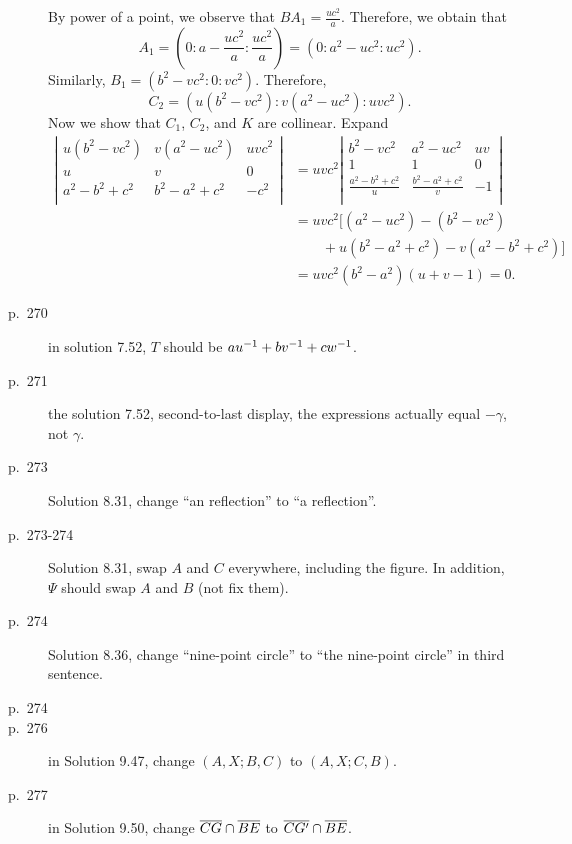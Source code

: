 \documentclass[11pt]{scrartcl}
\begin{document}
\begin{description}
  By power of a point, we observe that $BA_1 = \frac{uc^2}{a}$.
  Therefore, we obtain that
  \[ A_1 = \left( 0:a-\frac{uc^2}{a}: \frac{uc^2}{a} \right)
    = \left( 0:a^{2}-uc^2 : uc^2 \right). \]
  Similarly, $B_1 = \left( b^2-vc^2 : 0 : vc^2 \right)$.
  Therefore,
  \[ C_2 = \left( u(b^2-vc^2) : v(a^2-uc^2) : uvc^2 \right). \]
  Now we show that $C_1$, $C_2$, and $K$ are collinear.
  Expand
  \begin{align*}
  \left\lvert
  \begin{array}{ccc}
    u (b^2-vc^2) & v (a^2-uc^2) & uv c^2 \\
    u & v & 0 \\
    a^2-b^2+c^2 & b^2-a^2+c^2 & -c^2 \\
  \end{array}
  \right\rvert
  &= uvc^2 \left\lvert
  \begin{array}{ccc}
    b^2-vc^2 & a^2-uc^2 & uv \\
    1 & 1 & 0 \\
    \frac{a^2-b^2+c^2}{u} & \frac{b^2-a^2+c^2}{v} & -1 \\
  \end{array}
  \right\rvert \\
  &= uvc^2 \Big[ (a^2-uc^2)-(b^2-vc^2) \\
    &\qquad+ u(b^2-a^2+c^2) - v(a^2-b^2+c^2) \Big] \\
    &= uvc^2 (b^2-a^2)(u+v-1) = 0.
  \end{align*}
\item[p.\  270] in solution 7.52, $T$ should be $au^{-1}+bv^{-1}+cw^{-1}$.
\item[p.\  271] the solution 7.52, second-to-last display,
  the expressions actually equal $-\gamma$, not $\gamma$.
\item[p.\ 273] Solution 8.31, change ``an reflection'' to ``a reflection''.
\item[p.\ 273-274] Solution 8.31, swap $A$ and $C$ everywhere, including the figure.
  In addition, $\Psi$ should swap $A$ and $B$ (not fix them).
\item[p.\  274] Solution 8.36, change ``nine-point circle''
  to ``the nine-point circle'' in third sentence.
\item[p.\  274] 
\item[p.\  276] in Solution 9.47, change $(A,X;B,C)$ to $(A,X;C,B)$.
\item[p.\  277] in Solution 9.50, change $\overline{CG} \cap \overline{BE}$ to $\overline{CG'} \cap \overline{BE}$.

\end{description}
\end{document}
